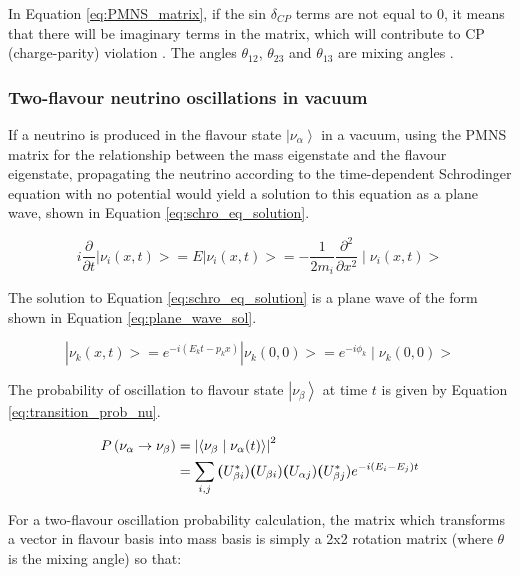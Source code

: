 In Equation \ref{eq:PMNS_matrix}, if the sin $\delta_{CP}$ terms are not equal to 0, it means that there will be imaginary terms in the matrix, which will contribute to CP (charge-parity) violation \cite{NUNOKAWA2008338}. The angles $\theta_{12}$, $\theta_{23}$ and $\theta_{13}$ are mixing angles \cite{giganti2018neutrino}.

\subsubsection{Two-flavour neutrino oscillations in vacuum}

If a neutrino is produced in the flavour state $\left|\nu_{\alpha}\right\rangle$ in a vacuum, using the PMNS matrix for the relationship between the mass eigenstate and the flavour eigenstate, propagating the neutrino according to the time-dependent Schrodinger equation with no potential would yield a solution to this equation as a plane wave, shown in Equation \ref{eq:schro_eq_solution}.

\begin{equation}
i \frac{\partial}{\partial t}\left|\nu_{i}(x, t)>=E\right| \nu_{i}(x, t)>=-\frac{1}{2 m_{i}} \frac{\partial^{2}}{\partial x^{2}} \mid \nu_{i}(x, t)>
\label{eq:schro_eq_solution}   
\end{equation}

The solution to Equation \ref{eq:schro_eq_solution} is a plane wave of the form shown in Equation \ref{eq:plane_wave_sol}.

\begin{equation}
\left|\nu_{k}(x, t)>=e^{-i\left(E_{k} t-p_{k} x\right)}\right| \nu_{k}(0,0)>=e^{-i \phi_{k}} \mid \nu_{k}(0,0)>
\label{eq:plane_wave_sol}
\end{equation}

The probability of oscillation to flavour state $\left|\nu_{\beta}\right\rangle$ at time $t$ is given by Equation \ref{eq:transition_prob_nu}. 


\begin{align}
P\left(\nu_{\alpha} \rightarrow \nu_{\beta}\right) &=\left|\left\langle\nu_{\beta} \mid \nu_{\alpha}(t)\right\rangle\right|^{2} \label{eq:transition_prob_nu}\\
&=\sum_{i, j} \boldsymbol(U_{\beta i}^{*})\boldsymbol(U_{\beta i})\boldsymbol(U_{\alpha j})\boldsymbol(U_{\beta j}^{*}) e^{-i\left(E_{i}-E_{j}\right) t} \notag
\end{align}



For a two-flavour oscillation probability calculation, the matrix which transforms a vector in flavour basis into mass basis is simply a 2x2 rotation matrix (where $\theta$ is the mixing angle) so that:

